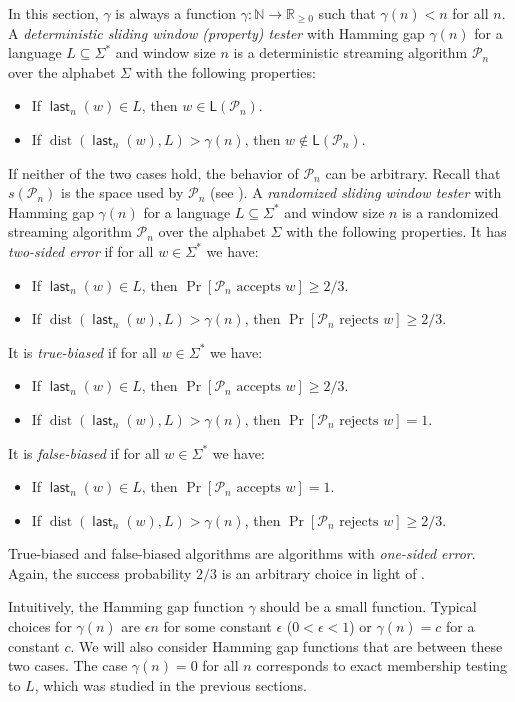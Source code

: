 \documentclass{article}\usepackage[a4paper,margin=20mm]{geometry}
\newcommand{\N}{\mathbb{N}}
\renewcommand{\P}{\mathcal{P}}
\renewcommand{\L}{\mathsf{L}}
\DeclareMathOperator{\last}{\mathsf{last}}
\DeclareMathOperator{\dist}{dist}
\renewcommand{\geq}{\geqslant}
\renewcommand{\ge}{\geq}
\begin{document}
In this section, $\gamma$ is always a function $\gamma \colon \N \to \mathbb{R}_{\geq 0}$ such that $\gamma(n) < n$ for all $n$.
A {\em deterministic sliding window (property) tester} with Hamming gap $\gamma(n)$ for a language $L \subseteq \Sigma^*$
and window size $n$  is a deterministic streaming algorithm $\P_n$
over the alphabet $\Sigma$ with the following properties:
\begin{itemize}
\item If $\last_n(w) \in L$, then $w \in \L(\P_n)$.
\item If $\dist(\last_n(w),L) > \gamma(n)$, then $w \notin \L(\P_n)$.
\end{itemize}
If neither of the two cases hold, the behavior of $\P_n$ can be arbitrary. Recall that $s(\P_n)$ is the space used by $\P_n$ (see ).
A {\em randomized sliding window tester} with Hamming gap $\gamma(n)$ for a language $L \subseteq \Sigma^*$
and window size $n$  is a randomized streaming algorithm $\P_n$
over the alphabet $\Sigma$ with the following properties.
It has {\em two-sided error} if for all $w \in \Sigma^*$ we have:
\begin{itemize}
\item If $\last_n(w) \in L$, then $\Pr[\P_n \text{ accepts } w] \ge 2/3$.
\item If $\dist(\last_n(w),L) > \gamma(n)$, then $\Pr[\P_n \text{ rejects } w] \ge 2/3$.
\end{itemize}
It is {\em true-biased} if for all $w \in \Sigma^*$ we have:
\begin{itemize}
\item If $\last_n(w) \in L$, then $\Pr[\P_n \text{ accepts } w] \ge 2/3$.
\item If $\dist(\last_n(w),L) > \gamma(n)$, then $\Pr[\P_n \text{ rejects } w] = 1$.
\end{itemize}
It is {\em false-biased} if for all $w \in \Sigma^*$ we have:
\begin{itemize}
\item If $\last_n(w) \in L$, then $\Pr[\P_n \text{ accepts } w] = 1$.
\item If $\dist(\last_n(w),L) > \gamma(n)$, then $\Pr[\P_n \text{ rejects } w] \ge 2/3$.
\end{itemize}
True-biased and false-biased algorithms are algorithms with {\em one-sided error}.
Again, the success probability $2/3$ is an arbitrary choice in light of .

Intuitively, the Hamming gap function $\gamma$ should be a small function.
Typical choices for  $\gamma(n)$ are $\epsilon n$ for some constant $\epsilon$ 
($0 < \epsilon < 1$) or $\gamma(n) = c$ for a constant $c$. We will also consider Hamming gap functions that
are between these two cases.
The case $\gamma(n) = 0$ for all $n$ corresponds to exact membership testing to $L$, which was studied in 
the previous sections.
\end{document}
